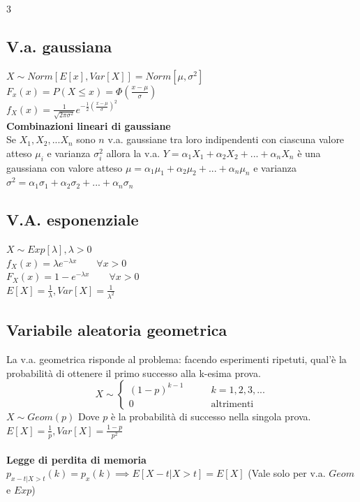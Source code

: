 \documentclass{article}
\begin{document}
\begin{multicols*}{3}
		\subsection{V.a. gaussiana}
		\(X \sim Norm[E[x],Var[X]] = Norm[\mu,\sigma^2]\)\\
		\(F_x(x) = P(X\leq x) = \Phi(\frac{x-\mu}{\sigma})\)\\
		\(f_X(x)= \frac{1}{\sqrt{2\pi \sigma^2}}e^{-\frac{1}{2}(\frac{x-\mu}{\sigma})^2}\)\\
		\textbf{Combinazioni lineari di gaussiane}\\
		Se \(X_1,X_2,...X_n\) sono \(n\) v.a. gaussiane tra loro indipendenti con ciascuna valore atteso \(\mu_i\) e varianza \(\sigma^2_i\) allora la v.a. \(Y= \alpha_1X_1+\alpha_2X_2+...+\alpha_nX_n\) è una gaussiana con valore atteso \(\mu = \alpha_1\mu_1+\alpha_2\mu_2+...+\alpha_n\mu_n\) e varianza \(\sigma^2 = \alpha_1\sigma_1+ \alpha_2\sigma_2+...+\alpha_n\sigma_n\)
		
		
		\subsection{V.A. esponenziale}
		\(X\sim Exp[\lambda], \lambda > 0\)\\
		\(f_X(x) = \lambda e^{-\lambda x} \qquad \forall x>0\)\\
		\(F_X(x) = 1-e^{-\lambda x} \qquad \forall x>0\)\\
		\(E[X] = \frac{1}{\lambda}, Var[X] = \frac{1}{\lambda^2}\)\\
		\subsection{Variabile aleatoria geometrica}
		La v.a. geometrica risponde al problema: facendo esperimenti ripetuti, qual'è la probabilità di ottenere il primo successo alla k-esima prova.\\ 
		\begin{equation*}
			X \sim
			\left\{
			\begin{alignedat}{2}
				(1-p)^{k-1}  & \qquad k=1,2,3,...\\
				0            & \qquad \text{altrimenti}
			\end{alignedat}
			\right.
		\end{equation*}
		\(X \sim Geom(p)\) Dove \(p\) è la probabilità di successo nella singola prova.\\
		\(E[X] = \frac{1}{p}, Var[X] = \frac{1-p}{p^2}\)\\\\
		\textbf{Legge di perdita di memoria}\\
		\(p_{x-t|X>t}(k) = p_x (k) \implies E[X-t|X>t] = E[X]\) (Vale solo per v.a. \(Geom\) e \(Exp\))
		

\end{multicols*}
\end{document}
